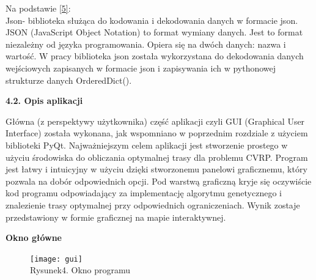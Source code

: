 \documentclass[a4paper, twoside, 12pt, justified]{article}
\begin{document}
	 
	 Na podstawie \hyperlink{json}{[5]}:\\
	 Json- biblioteka służąca do kodowania i dekodowania danych w formacie json. JSON (JavaScript Object Notation) to format wymiany danych. Jest to format niezależny od języka programowania. Opiera się na dwóch danych: nazwa i wartość. W pracy biblioteka json została wykorzystana do dekodowania danych wejściowych zapisanych w formacie json i zapisywania ich w pythonowej strukturze danych OrderedDict().\\
	 
	
	
	\newpage
	
	
	\begin{flushleft}
		\begin{large}
			\textbf{4.2. Opis aplikacji}
		\end{large}
	\end{flushleft}
	\vspace{10mm} %
	
	Główna (z perspektywy użytkownika) część aplikacji czyli GUI (Graphical User Interface) została wykonana, jak wspomniano w poprzednim rozdziale z użyciem biblioteki PyQt. Najważniejszym celem aplikacji jest stworzenie prostego w użyciu środowiska do obliczania optymalnej trasy dla problemu CVRP. Program jest łatwy i intuicyjny w użyciu dzięki stworzonemu panelowi graficznemu, który pozwala na dobór odpowiednich opcji. Pod warstwą graficzną kryje się oczywiście kod programu odpowiadający za implementację algorytmu genetycznego i znalezienie trasy optymalnej przy odpowiednich ograniczeniach. Wynik zostaje przedstawiony w formie graficznej na mapie interaktywnej.

	\begin{large}
		\begin{center}
			\textbf{Okno główne}
		\end{center}
	\end{large}

	\begin{figure}[h]
		\texttt{[image: gui]}
		\centering
		\\
		{Rysunek4. Okno programu}
	\end{figure}
	
\end{document}
